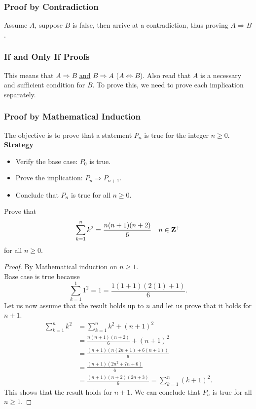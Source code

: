\documentclass{article}
\begin{document}
	\subsubsection*{Proof by Contradiction}
	
	Assume $ A $, suppose $ B $ is false, then arrive at a contradiction, thus proving $ A \Rightarrow B $.
	
	\subsubsection*{If and Only If Proofs}
	
	This means that $ A \Rightarrow B $ \underline{and} $ B \Rightarrow A $ ($ A \Leftrightarrow B $). Also read that $ A $ is a necessary and sufficient condition for $ B $. To prove this, we need to prove each implication separately.
	
	\subsubsection*{Proof by Mathematical Induction}
	
	The objective is to prove that a statement $ P_n $ is true for the integer $ n \geq 0 $. \\
	
	\textbf{Strategy}
	\begin{itemize}
		\item  Verify the base case: $ P_0 $ is true.
		\item Prove the implication: $ P_n \Rightarrow P_{n+1} $.
		\item Conclude that $ P_n $ is true for all $ n \geq 0 $.
	\end{itemize}

	\begin{eg}
		Prove that 
		\[
			\sum\limits_{k=1}^{n} k^2 = \frac{n(n+1)(n+2)}{6} \quad n \in \mathbf{Z}^+
		\]
		for all $ n \geq 0 $.
		
		\begin{proof}
			By Mathematical induction on $ n \geq 1 $. \\
			
			Base case is true because
			\[
				\sum\limits_{k=1}^{1} 1^2 = 1 = \dfrac{1(1+1)(2(1)+1)}{6} .
			\]
			Let us now assume that the result holds up to $ n $ and let us prove that it holds for $ n+1 $.
			\begin{align*}
				\sum\limits_{k=1}^{n} k^2 &= \sum\limits_{k=1}^{n} k^2 + (n+1)^2 \\
				&= \frac{n(n+1)(n+2)}{6} + (n+1)^2 \\
				&= \frac{(n+1)(n(2n+1) + 6(n+1))}{6} \\
				&= \frac{(n+1)(2n^2 + 7n + 6)}{6} \\
				&= \frac{(n+1)(n+2)(2n+3)}{6} = \sum\limits_{k=1}^{n} (k+1)^2. 
			\end{align*}
			This shows that the result holds for $ n+1 $. We can conclude that $ P_n $ is true for all $ n \geq 1 $.
		\end{proof}
	\end{eg}
	
\end{document}
